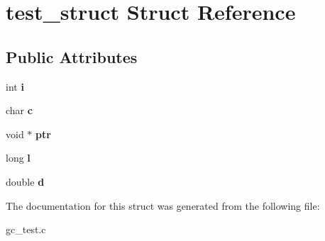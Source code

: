 \hypertarget{structtest__struct}{\section{test\-\_\-struct Struct Reference}
\label{structtest__struct}
}
\subsection*{Public Attributes}
\begin{DoxyCompactItemize}
\item 
\hypertarget{structtest__struct_af83b58915cfa71e1aecdee37ab6a90e4}{int {\bfseries i}}\label{structtest__struct_af83b58915cfa71e1aecdee37ab6a90e4}

\item 
\hypertarget{structtest__struct_aaa06c5e545861f5e6b24f90b460cc6da}{char {\bfseries c}}\label{structtest__struct_aaa06c5e545861f5e6b24f90b460cc6da}

\item 
\hypertarget{structtest__struct_a54bc6000450b59faa3a791f044ecb8fb}{void $\ast$ {\bfseries ptr}}\label{structtest__struct_a54bc6000450b59faa3a791f044ecb8fb}

\item 
\hypertarget{structtest__struct_a169248f38460a21a2aae898b45fc3107}{long {\bfseries l}}\label{structtest__struct_a169248f38460a21a2aae898b45fc3107}

\item 
\hypertarget{structtest__struct_a74068b2ff3c63ec28ef6686f24133697}{double {\bfseries d}}\label{structtest__struct_a74068b2ff3c63ec28ef6686f24133697}

\end{DoxyCompactItemize}


The documentation for this struct was generated from the following file\-:\begin{DoxyCompactItemize}
\item 
gc\-\_\-test.\-c\end{DoxyCompactItemize}
